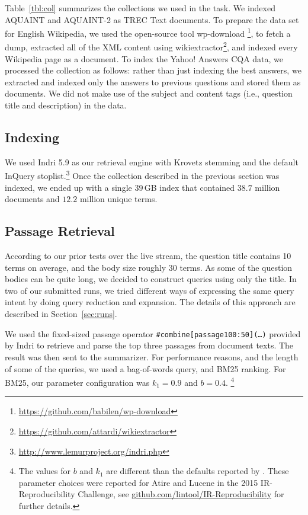 \documentclass[a4paper,10pt,conference,compsocconf,final]{IEEEtran}
\newcommand\method[1]{{\sf\small{#1}}}
\newcommand\gb[1]{$#1$\,GB}
\begin{document}
{{{{Table~{\ref{tbl:col}} summarizes the collections we used in the task.  We
indexed AQUAINT and AQUAINT-2 as TREC Text documents.
To prepare the data set for English Wikipedia, we used the
open-source tool {\method{wp-download}}
\footnote{\url{https://github.com/babilen/wp-download}}, to fetch a
dump, extracted all of the XML content using
{\method{wikiextractor}}\footnote{\url{https://github.com/attardi/wikiextractor}},
and indexed every Wikipedia page as a document.
To index the Yahoo! Answers CQA data, we processed the collection as 
follows: rather than just indexing the best answers, we extracted and
indexed only the answers to previous questions and stored them as
documents.
We did not make use of the subject and content tags (i.e., question
title and description) in the data.

\subsection{Indexing}
We used Indri 5.9 as our retrieval engine with Krovetz stemming and
the default InQuery
stoplist.\footnote{\url{http://www.lemurproject.org/indri.php}}
Once the collection described in the previous section was indexed, we 
ended up with a single \gb{39} index that contained $38.7$
million documents and $12.2$ million unique terms.

\subsection{Passage Retrieval}
\label{sec:passage}

According to our prior tests over the live stream, the question title
contains 10 terms on average, and the body size roughly 30 terms.
As some of the question bodies can be quite long, we decided to 
construct queries using only the title.
In two of our submitted runs, we tried different ways of expressing
the same query intent by doing query reduction and expansion.
The details of this approach are described in Section~\ref{sec:runs}.

We used the fixed-sized passage operator
\texttt{\#combine[passage100:50](\ldots)} provided by Indri to
retrieve and parse the top three passages from document texts.
The result was then sent to the summarizer.
For performance reasons, and the length of some of the queries, we
used a bag-of-words query, and BM25 ranking.
For BM25, our parameter configuration was $k_1=0.9$ and $b=0.4$.
\footnote{The values for $b$ and $k_1$ are different than the
defaults reported by {\citet{rwj+94-trec}}.
These parameter choices were reported for Atire and Lucene in the
2015 IR-Reproducibility Challenge, see
{\url{github.com/lintool/IR-Reproducibility}} for further details.}

}}}}
\end{document}
